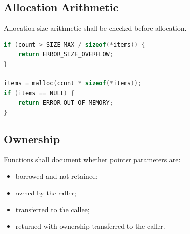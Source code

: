\subsection{Allocation Arithmetic}

Allocation-size arithmetic shall be checked before allocation.

\begin{lstlisting}[language=C]
if (count > SIZE_MAX / sizeof(*items)) {
	return ERROR_SIZE_OVERFLOW;
}

items = malloc(count * sizeof(*items));
if (items == NULL) {
	return ERROR_OUT_OF_MEMORY;
}
\end{lstlisting}

\subsection{Ownership}

Functions shall document whether pointer parameters are:

\begin{itemize}
	\item borrowed and not retained;
	\item owned by the caller;
	\item transferred to the callee;
	\item returned with ownership transferred to the caller.
\end{itemize}
